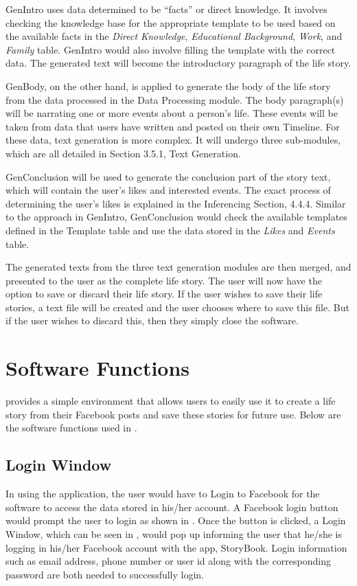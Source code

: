 GenIntro uses data determined to be ``facts” or direct knowledge. It involves checking the knowledge base for the appropriate template to be used based on the available facts in the \textit{Direct Knowledge}, \textit{Educational Background}, \textit{Work}, and \textit{Family} table. GenIntro would also involve filling the template with the correct data. The generated text will become the introductory paragraph of the life story.

GenBody, on the other hand, is applied to generate the body of the life story from the data processed in the Data Processing module. The body paragraph(s) will be narrating one or more events about a person's life. These events will be taken from data that users have written and posted on their own Timeline. For these data, text generation is more complex. It will undergo three sub-modules, which are all detailed in Section 3.5.1, Text Generation.

GenConclusion will be used to generate the conclusion part of the story text, which will contain the user's likes and interested events. The exact process of determining the user's likes is explained in the Inferencing Section, 4.4.4. Similar to the approach in GenIntro, GenConclusion would check the available templates defined in the Template table and use the data stored in the \textit{Likes} and \textit{Events} table.

The generated texts from the three text generation modules are then merged, and presented to the user as the complete life story. The user will now have the option to save or discard their life story. If the user wishes to save their life stories, a text file will be created and the user chooses where to save this file. But if the user wishes to discard this, then they simply close the software.

\section{Software Functions}
\systemname provides a simple environment that allows users to easily use it to create a life story from their Facebook posts and save these stories for future use. Below are the software functions used in \systemname.

\subsection{Login Window}
In using the application, the user would have to Login to Facebook for the software to access the data stored in his/her account. A Facebook login button would prompt the user to login as shown in . Once the button is clicked, a Login Window, which can be seen in , would pop up informing the user that he/she is logging in his/her Facebook account with the app, StoryBook. Login information such as email address, phone number or user id along with the corresponding password are both needed to successfully login. 

